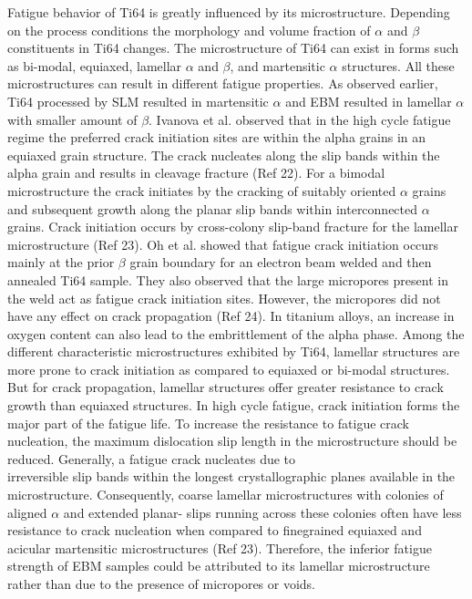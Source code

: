 \documentclass[10pt]{article}
\begin{document}
Fatigue behavior of Ti64 is greatly influenced by its microstructure. Depending on the process conditions the morphology and volume fraction of $\alpha$ and $\beta$ constituents in Ti64 changes. The microstructure of Ti64 can exist in forms such as bi-modal, equiaxed, lamellar $\alpha$ and $\beta$, and martensitic $\alpha$ structures. All these microstructures can result in different fatigue properties. As observed earlier, Ti64 processed by SLM resulted in martensitic $\alpha$ and EBM resulted in lamellar $\alpha$ with smaller amount of $\beta$. Ivanova et al. observed that in the high cycle fatigue regime the preferred crack initiation sites are within the alpha grains in an equiaxed grain structure. The crack nucleates along the slip bands within the alpha grain and results in cleavage fracture (Ref 22). For a bimodal microstructure the crack initiates by the cracking of suitably oriented $\alpha$ grains and subsequent growth along the planar slip bands within interconnected $\alpha$ grains. Crack initiation occurs by cross-colony slip-band fracture for the lamellar microstructure (Ref 23). Oh et al. showed that fatigue crack initiation occurs mainly at the prior $\beta$ grain boundary for an electron beam welded and then annealed Ti64 sample. They also observed that the large micropores present in the weld act as fatigue crack initiation sites. However, the micropores did not have any effect on crack propagation (Ref 24). In titanium alloys, an increase in oxygen content can also lead to the embrittlement of the alpha phase. Among the different characteristic microstructures exhibited by Ti64, lamellar structures are more prone to crack initiation as compared to equiaxed or bi-modal structures. But for crack propagation, lamellar structures offer greater resistance to crack growth than equiaxed structures. In high cycle fatigue, crack initiation forms the major part of the fatigue life. To increase the resistance to fatigue crack nucleation, the maximum dislocation slip length in the microstructure should be reduced. Generally, a fatigue crack nucleates due to\\
irreversible slip bands within the longest crystallographic planes available in the microstructure. Consequently, coarse lamellar microstructures with colonies of aligned $\alpha$ and extended planar- slips running across these colonies often have less resistance to crack nucleation when compared to finegrained equiaxed and acicular martensitic microstructures (Ref 23). Therefore, the inferior fatigue strength of EBM samples could be attributed to its lamellar microstructure rather than due to the presence of micropores or voids.
\end{document}
